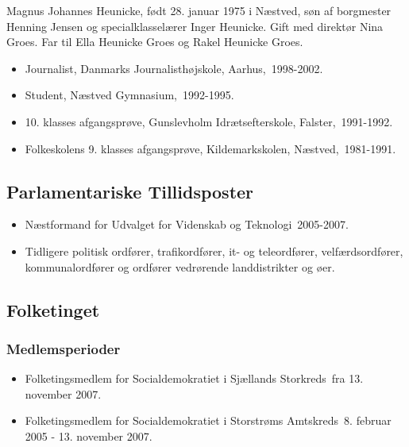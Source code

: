 \documentclass[11pt, a4paper]{awesome-cv}
\begin{document}
\makecvheader[R]
\makelettertitle
\begin{cvletter}
Magnus Johannes Heunicke, født 28. januar 1975 i Næstved, søn af borgmester Henning Jensen og specialklasselærer Inger Heunicke. Gift med direktør Nina Groes. Far til Ella Heunicke Groes og Rakel Heunicke Groes.

\begin{itemize}
\item Journalist, Danmarks Journalisthøjskole, Aarhus, 1998-2002.
\item Student, Næstved Gymnasium, 1992-1995.
\item 10. klasses afgangsprøve, Gunslevholm Idrætsefterskole, Falster, 1991-1992.
\item Folkeskolens 9. klasses afgangsprøve, Kildemarkskolen, Næstved, 1981-1991.
\end{itemize}
\subsection*{Parlamentariske Tillidsposter}
\begin{itemize}
\item Næstformand for Udvalget for Videnskab og Teknologi 2005-2007.
\item Tidligere politisk ordfører, trafikordfører, it- og teleordfører, velfærdsordfører, kommunalordfører og ordfører vedrørende landdistrikter og øer.
\end{itemize}
\subsection*{Folketinget}
\subsubsection*{Medlemsperioder}
\begin{itemize}
\item Folketingsmedlem for Socialdemokratiet i Sjællands Storkreds fra 13. november 2007.
\item Folketingsmedlem for Socialdemokratiet i Storstrøms Amtskreds 8. februar 2005 - 13. november 2007.
\end{itemize}

\end{cvletter}
\end{document}
